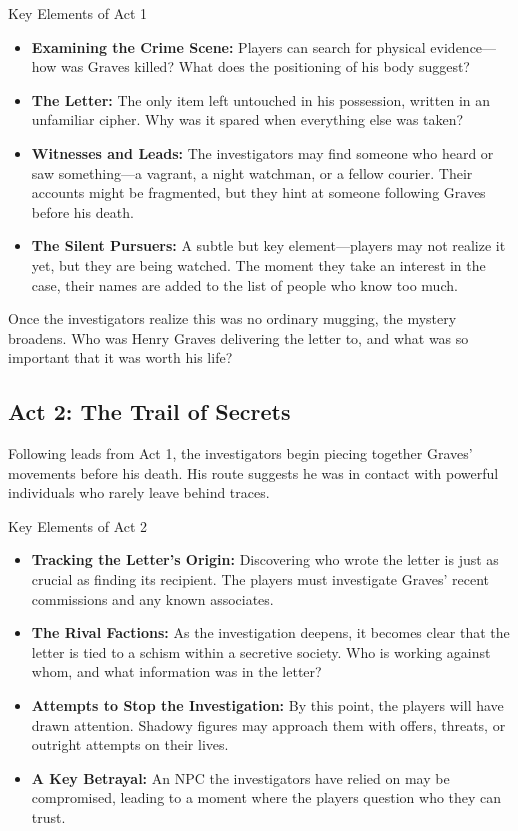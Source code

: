 \begin{Example}{Key Elements of Act 1}
    \begin{itemize}
        \item \textbf{Examining the Crime Scene:} Players can search for physical evidence—how was Graves killed? What does the positioning of his body suggest?
        \item \textbf{The Letter:} The only item left untouched in his possession, written in an unfamiliar cipher. Why was it spared when everything else was taken?
        \item \textbf{Witnesses and Leads:} The investigators may find someone who heard or saw something—a vagrant, a night watchman, or a fellow courier. Their accounts might be fragmented, but they hint at someone following Graves before his death.
        \item \textbf{The Silent Pursuers:} A subtle but key element—players may not realize it yet, but they are being watched. The moment they take an interest in the case, their names are added to the list of people who know too much.
    \end{itemize}
\end{Example}

\noindent
Once the investigators realize this was no ordinary mugging, the mystery broadens. Who was Henry Graves delivering the letter to, and what was so important that it was worth his life?

\subsection{Act 2: The Trail of Secrets}  
Following leads from Act 1, the investigators begin piecing together Graves' movements before his death. His route suggests he was in contact with powerful individuals who rarely leave behind traces.  

\begin{Example}{Key Elements of Act 2}
    \begin{itemize}
        \item \textbf{Tracking the Letter’s Origin:} Discovering who wrote the letter is just as crucial as finding its recipient. The players must investigate Graves' recent commissions and any known associates.
        \item \textbf{The Rival Factions:} As the investigation deepens, it becomes clear that the letter is tied to a schism within a secretive society. Who is working against whom, and what information was in the letter?
        \item \textbf{Attempts to Stop the Investigation:} By this point, the players will have drawn attention. Shadowy figures may approach them with offers, threats, or outright attempts on their lives.
        \item \textbf{A Key Betrayal:} An NPC the investigators have relied on may be compromised, leading to a moment where the players question who they can trust.
    \end{itemize}
\end{Example}

